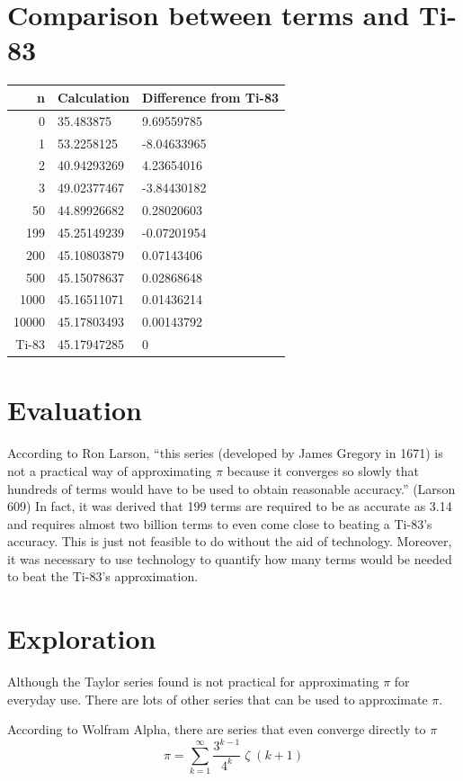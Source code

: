 \documentclass[12pt, titlepage]{article}
\begin{document}
\section{Comparison between terms and Ti-83}
\begin{center}
  \begin{tabular}{rll}
  n & Calculation & Difference from Ti-83\\
  \hline
    0 & 35.483875 & 9.69559785\\
  1 & 53.2258125 & -8.04633965\\
  2 & 40.94293269 & 4.23654016\\
  3 & 49.02377467 & -3.84430182\\
  50 & 44.89926682& 0.28020603\\
  199 & 45.25149239 &-0.07201954 \\
  200 &  45.10803879& 0.07143406\\
  500 & 45.15078637 & 0.02868648\\
  1000 & 45.16511071 & 0.01436214\\
  10000 & 45.17803493 & 0.00143792\\
  \hline
  Ti-83 & 45.17947285  & 0\\
  \end{tabular}
\end{center}

\section{Evaluation}
According to Ron Larson, “this series (developed by James Gregory in 1671) is not a practical way of approximating \(\pi\) because it converges so slowly that hundreds of terms would have to be used to obtain reasonable accuracy.” (Larson 609) In fact, it was derived that 199 terms are required to be as accurate as 3.14 and requires almost two billion terms to even come close to beating a Ti-83’s accuracy. This is just not feasible to do without the aid of technology. Moreover, it was necessary to use technology to quantify how many terms would be needed to beat the Ti-83’s approximation.
\section{Exploration}
Although the Taylor series found is not practical for approximating \(\pi\) for everyday use. There are lots of other series that can be used to approximate \(\pi\). 

According to Wolfram Alpha, there are series that even converge directly to \(\pi\)
\begin{equation}
    \pi = \sum_{k=1}^{\infty} \frac{3^{k-1}}{4^{k}} \; \zeta \;(k+1)
\end{equation}
\end{document}
